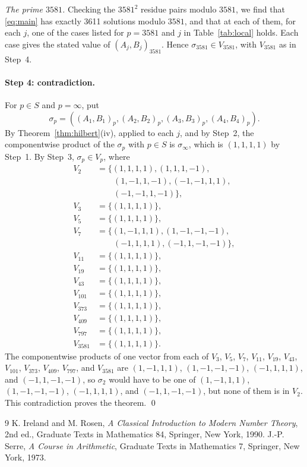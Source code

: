 \documentclass[11pt]{article}
\begin{document}
\emph{The prime $3581$.} Checking the $3581^2$ residue pairs modulo $3581$, we find that \eqref{eq:main} has exactly 3611 solutions modulo $3581$, and that at each of them, for each $j$, one of the cases listed for $p=3581$ and $j$ in Table~\ref{tab:local} holds. Each case gives the stated value of $(A_j,B_j)_{3581}$. Hence $\sigma_{3581}\in V_{3581}$, with $V_{3581}$ as in Step~4.

\paragraph{Step 4: contradiction.} For $p\in S$ and $p=\infty$, put \[\sigma_p=((A_{1},B_{1})_p,(A_{2},B_{2})_p,(A_{3},B_{3})_p,(A_{4},B_{4})_p).\] By Theorem~\ref{thm:hilbert}(iv), applied to each $j$, and by Step~2, the componentwise product of the $\sigma_p$ with $p\in S$ is $\sigma_\infty$, which is $(1,1,1,1)$ by Step~1. By Step~3, $\sigma_p\in V_p$, where
\begin{align*}
V_{2}&=\{(1,1,1,1),(1,1,1,-1),\\
&\qquad(1,-1,1,-1),(-1,-1,1,1),\\
&\qquad(-1,-1,1,-1)\},\\
V_{3}&=\{(1,1,1,1)\},\\
V_{5}&=\{(1,1,1,1)\},\\
V_{7}&=\{(1,-1,1,1),(1,-1,-1,-1),\\
&\qquad(-1,1,1,1),(-1,1,-1,-1)\},\\
V_{11}&=\{(1,1,1,1)\},\\
V_{19}&=\{(1,1,1,1)\},\\
V_{43}&=\{(1,1,1,1)\},\\
V_{101}&=\{(1,1,1,1)\},\\
V_{373}&=\{(1,1,1,1)\},\\
V_{409}&=\{(1,1,1,1)\},\\
V_{797}&=\{(1,1,1,1)\},\\
V_{3581}&=\{(1,1,1,1)\}.
\end{align*}The componentwise products of one vector from each of $V_{3}$, $V_{5}$, $V_{7}$, $V_{11}$, $V_{19}$, $V_{43}$, $V_{101}$, $V_{373}$, $V_{409}$, $V_{797}$, and $V_{3581}$ are $(1,-1,1,1)$, $(1,-1,-1,-1)$, $(-1,1,1,1)$, and $(-1,1,-1,-1)$, so $\sigma_{2}$ would have to be one of $(1,-1,1,1)$, $(1,-1,-1,-1)$, $(-1,1,1,1)$, and $(-1,1,-1,-1)$, but none of them is in $V_{2}$. This contradiction proves the theorem.
\qed

\begin{thebibliography}{9}
 K. Ireland and M. Rosen, \emph{A Classical Introduction to Modern Number Theory}, 2nd ed., Graduate Texts in Mathematics 84, Springer, New York, 1990.
 J.-P. Serre, \emph{A Course in Arithmetic}, Graduate Texts in Mathematics 7, Springer, New York, 1973.
\end{thebibliography}
\end{document}
